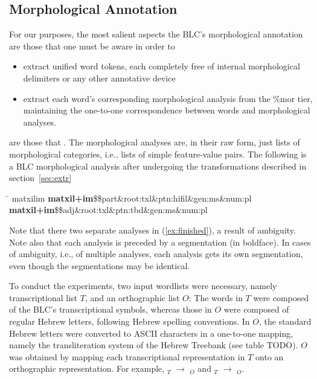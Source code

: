 \subsection{Morphological Annotation}
For our purposes, the most salient aspects the \ac{BLC}'s morphological annotation are those that one must be aware in order
to 
\begin{itemize}
\item extract unified word tokens, each completely free of internal morphological delimiters or any other annotative device
\item extract each word's corresponding morphological analysis from the \textsf{\%mor} tier, maintaining the one-to-one
correspondence between words and morphological analyses. 
\end{itemize}  are those that \citep{albert-et-al:2012}.
The morphological analyses are, in their raw form, just lists of morphological categories, 
i.e., lists of simple feature-value pairs.
The following is a \ac{BLC} morphological analysis after undergoing the transformations 
described in section~\ref{sec:extr}
\begin{exe} 
\ex \label{ex:finished}
\begin{tabbing}
\hspace{0.8in} \= \hspace{5.5in} \kill
\textsf{matxilim} \> \textsf{\textbf{matxil+im}\$\$part\&root:txl\&ptn:hifil\&gen:ms\&num:pl}\, \\
\> \textsf{\textbf{matxil+im}\$\$adj\&root:txl\&ptn:tbd\&gen:ms\&num:pl}
\end{tabbing}
\end{exe}
Note that there two separate analyses in (\ref{ex:finished}), a result of ambiguity. Note also that each analysis is preceded by a segmentation (in boldface). In cases of ambiguity, i.e., of multiple analyses, each analysis gets its own segmentation, even though
the segmentations may be identical.

To conduct the experiments, two input wordlists were necessary, namely transcriptional list $T$, and an orthographic list $O$:
The words in $T$ were composed of the \ac{BLC}'s transcriptional symbols, whereas those in $O$
were composed of regular Hebrew letters, following Hebrew spelling conventions. In $O$, the standard Hebrew letters were converted to ASCII characters in a one-to-one
mapping, namely the transliteration system of the Hebrew Treebank \citep{simaan-et-al:2001} (see table TODO).
$O$ was obtained by mapping each transcriptional representation in $T$ onto an orthographic representation. For example, $_T$ $\to$
$_O$ and $_T$ $\to$ $_O$.

